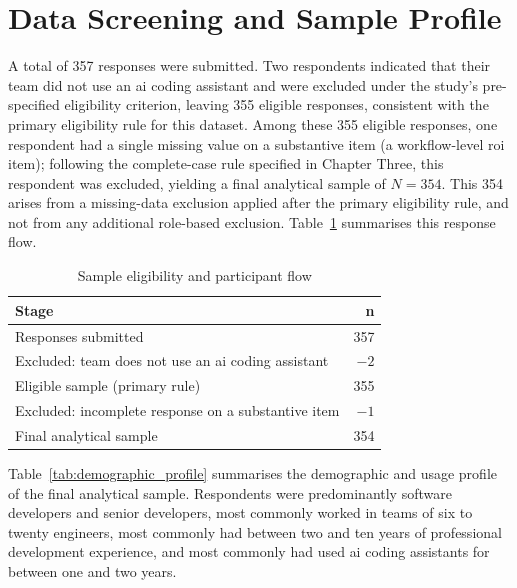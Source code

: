 \section{Data Screening and Sample Profile}
\label{sec:Data Screening and Sample Profile}
A total of 357 responses were submitted. Two respondents indicated that their team did not use an \gls{ai} coding assistant and were excluded under the study's pre-specified eligibility criterion, leaving 355 eligible responses, consistent with the primary eligibility rule for this dataset. Among these 355 eligible responses, one respondent had a single missing value on a substantive item (a workflow-level \gls{roi} item); following the complete-case rule specified in Chapter Three, this respondent was excluded, yielding a final analytical sample of $N = 354$. This 354 arises from a missing-data exclusion applied after the primary eligibility rule, and not from any additional role-based exclusion. Table~\ref{tab:sample_flow} summarises this response flow.

\begin{table}[htbp]
	\centering
	\caption{Sample eligibility and participant flow}
	\label{tab:sample_flow}
	\begin{tabular}{lr}
		\hline
		\textbf{Stage} & \textbf{n} \\
		\hline
		Responses submitted & 357 \\
		Excluded: team does not use an \gls{ai} coding assistant & $-2$ \\
		Eligible sample (primary rule) & 355 \\
		Excluded: incomplete response on a substantive item & $-1$ \\
		Final analytical sample & 354 \\
		\hline
	\end{tabular}
\end{table}

Table~\ref{tab:demographic_profile} summarises the demographic and usage profile of the final analytical sample. Respondents were predominantly software developers and senior developers, most commonly worked in teams of six to twenty engineers, most commonly had between two and ten years of professional development experience, and most commonly had used \gls{ai} coding assistants for between one and two years.

